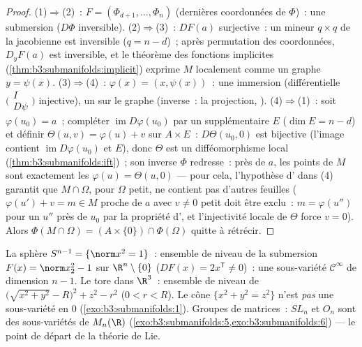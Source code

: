 \begin{proof}
(1)$\Rightarrow$(2)~: $F = (\Phi_{d+1}, \dots, \Phi_n)$
(dernières coordonnées de $\Phi$)~: une submersion ($D\Phi$
inversible).
(2)$\Rightarrow$(3)~: $DF(a)$ surjective~: un mineur $q
\times q$ de la jacobienne est inversible ($q = n - d$)~;
après permutation des coordonnées, $D_yF(a)$ est inversible, et
le théorème des fonctions implicites
(\cref{thm:b3:submanifolds:implicit}) exprime $M$ localement
comme un graphe $y = \psi(x)$.
(3)$\Rightarrow$(4)~: $\varphi(x) = (x, \psi(x))$~: une
immersion (différentielle $\bigl(\begin{smallmatrix}I\\
D\psi\end{smallmatrix}\bigr)$ injective), un  sur
le graphe (inverse~: la projection, ).
(4)$\Rightarrow$(1)~: soit $\varphi(u_0) = a$~; compléter
$\operatorname{im}D\varphi(u_0)$ par un supplémentaire $E$
($\dim E = n - d$) et définir $\Theta(u, v) = \varphi(u) + v$
sur $A\times E$~: $D\Theta(u_0, 0)$ est bijective (l'image
contient $\operatorname{im}D\varphi(u_0)$ et $E$), donc
$\Theta$ est un difféomorphisme local
(\cref{thm:b3:submanifolds:ift})~; son inverse $\Phi$
redresse~: près de $a$, les points de $M$ sont exactement les
$\varphi(u) = \Theta(u, 0)$ --- pour cela, l'hypothèse
d' dans (4) garantit que $M\cap\Omega$, pour
$\Omega$ petit, ne contient pas d'autres feuilles
($\varphi(u') + v = m \in M$ proche de $a$ avec $v \neq 0$
petit doit être exclu~: $m = \varphi(u'')$ pour un $u''$ près
de $u_0$ par la propriété d', et l'injectivité
locale de $\Theta$ force $v = 0$). Alors $\Phi(M\cap\Omega) =
(A\times\{0\})\cap\Phi(\Omega)$ quitte à rétrécir.
\end{proof}

\begin{example}\label{ex:b3:submanifolds:examples}
La sphère $S^{n-1} = \{\norm x^2 = 1\}$~: ensemble de niveau
de la submersion $F(x) = \norm x_2^2 - 1$ sur
$\R^n\setminus\{0\}$ ($DF(x) = 2x^{\mathsf T} \ne 0$)~: une
sous-variété $\mathcal C^\infty$ de dimension $n - 1$. Le tore
dans $\R^3$~: ensemble de niveau de $\bigl(\sqrt{x^2 + y^2} -
R\bigr)^2 + z^2 - r^2$ ($0 < r < R$). Le cône $\{x^2 + y^2 =
z^2\}$ n'est \emph{pas} une sous-variété en $0$
(\cref{exo:b3:submanifolds:1}). Groupes de matrices~: $SL_n$ et
$O_n$ sont des sous-variétés de $M_n(\R)$
(\cref{exo:b3:submanifolds:5,exo:b3:submanifolds:6}) --- le
point de départ de la théorie de Lie.
\end{example}

